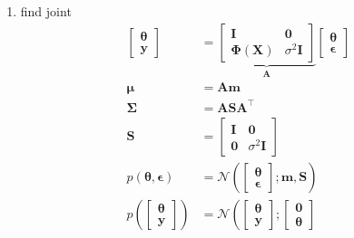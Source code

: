 \documentclass[a4paper, 12pt]{article}
\newcommand{\mat}[1]{\boldsymbol{#1}}
\renewcommand{\vec}[1]{\boldsymbol{#1}}
\begin{document}
            \begin{enumerate}
                \itemsep0em
                \item find joint
                    \begin{align*}
                        \begin{bmatrix}
                            \vec{\theta} \\ \vec{y}
                        \end{bmatrix} & = \underbrace{\begin{bmatrix}
                            \mat{I} & \mat{0} \\
                            \mat{\Phi}(\mat{X}) & \sigma^2\mat{I}
                        \end{bmatrix}}_{\mat{A}} \begin{bmatrix}
                            \vec{\theta} \\ \vec{\epsilon}
                        \end{bmatrix} \\
                        \vec{\mu} & = \mat{A}\vec{m} \\
                        \mat{\Sigma} & = \mat{A}\mat{S}\mat{A}^\top \\
                        \mat{S} & = \begin{bmatrix}
                            \mat{I} & \mat{0} \\
                            \mat{0} & \sigma^2\mat{I}
                        \end{bmatrix} \\
                        p(\vec{\theta}, \vec{\epsilon}) & = \mathcal{N}\left(\begin{bmatrix}
                            \vec{\theta} \\ \vec{\epsilon}
                        \end{bmatrix}; \vec{m}, \mat{S}\right) \\
                        p\left(\begin{bmatrix}
                            \vec{\theta} \\ \vec{y}
                        \end{bmatrix}\right) & = \mathcal{N}\left(\begin{bmatrix}
                            \vec{\theta} \\ \vec{y}
                        \end{bmatrix}; \begin{bmatrix}
                            \vec{0} \\ \vec{\theta} %

\end{bmatrix}
\end{align*}
\end{enumerate}
\end{document}
